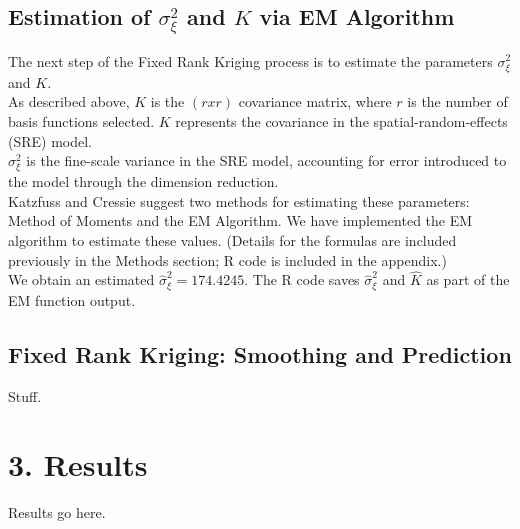 \documentclass[11pt]{article}
\begin{document}
\subsection{Estimation of $\sigma^2_{\xi}$ and $K$ via EM Algorithm}

The next step of the Fixed Rank Kriging process is to estimate the parameters $\sigma^2_{\xi}$ and $K$.  \\

As described above, $K$ is the $(r x r)$ covariance matrix, where $r$ is the number of basis functions selected.  $K$ represents the covariance in the spatial-random-effects (SRE) model.\\

$\sigma^2_{\xi}$ is the fine-scale variance in the SRE model, accounting for error introduced to the model through the dimension reduction. \\

Katzfuss and Cressie suggest two methods for estimating these parameters: Method of Moments and the EM Algorithm.  We have implemented the EM algorithm to estimate these values.  (Details for the formulas are included previously in the Methods section; R code is included in the appendix.)\\

We obtain an estimated $\hat{\sigma}^2_{\xi} = 174.4245$.  The R code saves $\hat{\sigma}^2_{\xi}$ and $\hat{K}$ as part of the EM function output.\\

\subsection{Fixed Rank Kriging: Smoothing and Prediction}

Stuff.\\


\newpage
\section{3. Results}

Results go here. \\

\newpage
\end{document}
